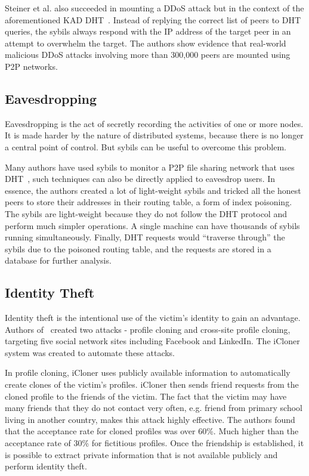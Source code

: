 Steiner et al. also succeeded in mounting a DDoS attack but in the context of
the aforementioned KAD DHT~\cite{steiner2007exploiting}. Instead of replying the
correct list of peers to DHT queries, the sybils always respond with the IP
address of the target peer in an attempt to overwhelm the target. The authors
show evidence that real-world malicious DDoS attacks involving more than 300,000
peers are mounted using P2P networks.

\subsection{Eavesdropping}
Eavesdropping is the act of secretly recording the activities of one or more
nodes. It is made harder by the nature of distributed systems, because there is
no longer a central point of control. But sybils can be useful to overcome this
problem.

Many authors have used sybils to monitor a P2P file sharing network that uses
DHT~\cite{holz2008measurements, steiner2007exploiting}, such techniques can also
be directly applied to eavesdrop users. In essence, the authors created a lot of
light-weight sybils and tricked all the honest peers to store their addresses in
their routing table, a form of index poisoning. The sybils are light-weight
because they do not follow the DHT protocol and perform much simpler operations.
A single machine can have thousands of sybils running simultaneously. Finally,
DHT requests would ``traverse through'' the sybils due to the poisoned routing
table, and the requests are stored in a database for further analysis.

\subsection{Identity Theft}
Identity theft is the intentional use of the victim's identity to gain an
advantage. Authors of~\cite{bilge2009all} created two attacks - profile cloning
and cross-site profile cloning, targeting five social network sites including
Facebook and LinkedIn. The iCloner system was created to automate these attacks.

In profile cloning, iCloner uses publicly available information to automatically
create clones of the victim's profiles. iCloner then sends friend requests from
the cloned profile to the friends of the victim. The fact that the victim may
have many friends that they do not contact very often, e.g. friend from primary
school living in another country, makes this attack highly effective. The
authors found that the acceptance rate for cloned profiles was over 60\%. Much
higher than the acceptance rate of 30\% for fictitious profiles. Once the
friendship is established, it is possible to extract private information that is
not available publicly and perform identity theft.

